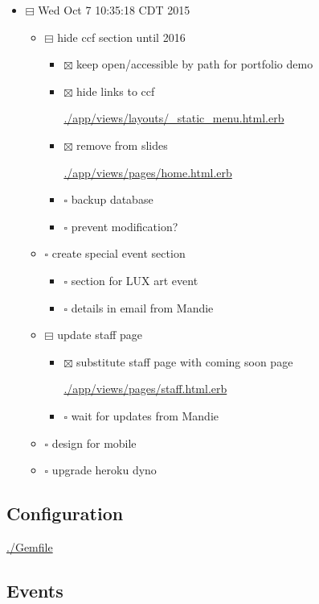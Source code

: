 \documentclass[11pt]{article}
\begin{document}
\begin{itemize}
\item $\boxminus$ Wed Oct  7 10:35:18 CDT 2015

\begin{itemize}
\item $\boxminus$ hide ccf section until 2016
\begin{itemize}
\item $\boxtimes$ keep open/accessible by path for portfolio demo
\item $\boxtimes$ hide links to ccf

\url{./app/views/layouts/_static_menu.html.erb}

\item $\boxtimes$ remove from slides

\url{./app/views/pages/home.html.erb}

\item $\square$ backup database
\item $\square$ prevent modification?
\end{itemize}
\item $\square$ create special event section
\begin{itemize}
\item $\square$ section for LUX art event
\item $\square$ details in email from Mandie
\end{itemize}
\item $\boxminus$ update staff page
\begin{itemize}
\item $\boxtimes$ substitute staff page with coming soon page

\url{./app/views/pages/staff.html.erb}

\item $\square$ wait for updates from Mandie
\end{itemize}
\item $\square$ design for mobile
\item $\square$ upgrade heroku dyno
\end{itemize}
\end{itemize}


\subsection*{Configuration}
\label{sec-1-2}

\url{./Gemfile}

\subsection*{Events}
\label{sec-1-3}
\end{document}
